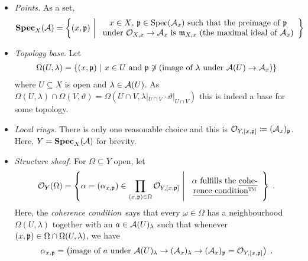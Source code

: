 \documentclass[a4paper,parskip=half,numbers=enddot, DIV=12]{scrreprt}
\begin{document}
\begin{itemize}
	\item \emph{Points.} As a set,
	\begin{align*}
	\SPEC_X(\Aa) = \left\{(x,\pp) \st 
	\begin{array}{c}
	x\in X\text{, }\pp \in \Spec(\Aa_x) \text{ such that the preimage of }\pp\\
	\text{under } \Oo_{X,x}\morphism \Aa_x \text{ is } \mm_{X,x}\text{ (the maximal ideal of }\Aa_x)
	\end{array}
	\right\}
	\end{align*}
	\item \emph{Topology base.} Let
	\begin{align*}
	\Omega(U,\lambda) = \left\{ (x,\mathfrak{p}) \ \middle|\  x\in U\text{ and }\mathfrak{p}\not\ni (\text{image of } \lambda \text{ under } \mathcal{A}(U)\to \mathcal{A}_x)\right\}
	\end{align*}
	where $U\subseteq X$ is open and $\lambda \in \mathcal{A}(U)$. As $\Omega(U,\lambda) \cap \Omega(V,\vartheta) = \Omega(U\cap V, \lambda|_{U\cap V} \cdot \vartheta|_{U\cap V})$ this is indeed a base for some topology.
	\item \emph{Local rings.} There is only one reasonable choice and this is $\mathcal{O}_{Y,[x,\mathfrak{p}]} \coloneqq (\mathcal{A}_x)_{\mathfrak{p}}$. Here, $Y=\operatorname{\mathbf{Spec}}_X(\mathcal{A})$ for brevity.
	\item \emph{Structure sheaf.} For $\Omega\subseteq Y$ open, let
	\begin{align*}
	\Oo_Y(\Omega) = \left\{\alpha=(\alpha_{x,\pp})\in \prod_{(x,\pp)\in \Omega} \Oo_{Y,[x,\pp]}\st 
	\begin{array}{c}
	\alpha\text{ fulfills the \emph{cohe-}}\\
	\text{\emph{rence condition}\texttrademark}
	\end{array}
	\right\}\;.
	\end{align*}
	Here, the \emph{coherence condition}\texttrademark\ says that every $\omega\in \Omega$ has a neighbourhood $\Omega(U,\lambda)$ together with an $a\in \mathcal{A}(U)_\lambda$ such that whenever $(x,\mathfrak{p})\in \Omega\cap \Omega(U,\lambda)$, we have
	\begin{align*}
	\alpha_{x,\mathfrak{p}}=\left(\text{image of }a\text{ under }\mathcal{A}(U)_\lambda \to (\mathcal{A}_x)_\lambda \to (\mathcal{A}_x)_{\mathfrak{p}} = \mathcal{O}_{Y,[x,\mathfrak{p}]}\right)\;.
	\end{align*}
\end{itemize}
\end{document}
